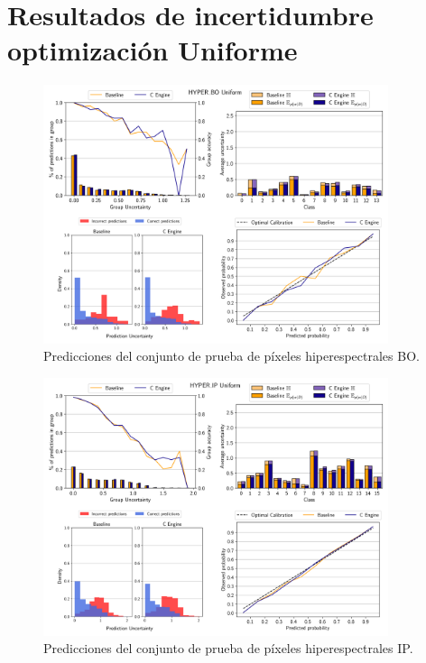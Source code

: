 \chapter{Resultados de incertidumbre optimización Uniforme} \label{anx:uniforme}

\begin{figure}[ht]
    \centering
    \includegraphics[width=0.9\textwidth]{root/Imagenes/anexo/Uniform-HYPER_BO-mosaic.png}
    \caption{Predicciones del conjunto de prueba de píxeles hiperespectrales BO.}
    \label{fig:anx-Uniform-HYPER_BO}
\end{figure}


\begin{figure}[ht]
    \centering
    \includegraphics[width=0.9\textwidth]{root/Imagenes/anexo/Uniform-HYPER_IP-mosaic.png}
    \caption{Predicciones del conjunto de prueba de píxeles hiperespectrales IP.}
    \label{fig:anx-Uniform-HYPER_IP}
\end{figure}


